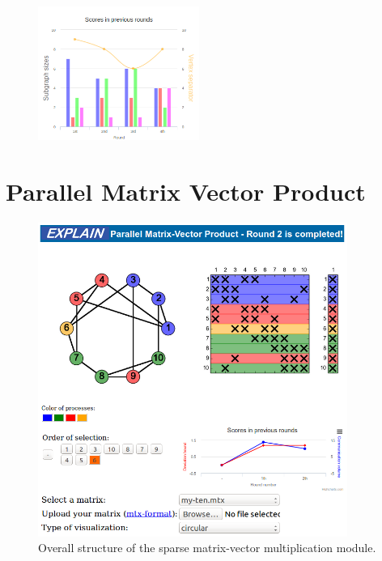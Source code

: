 \documentclass[12pt, oneside]{book}
\begin{document}
\begin{figure}
\centering
\includegraphics[width=0.47\textwidth]{chart2}
\caption{}
\label{barchart}
\end{figure}

\section{Parallel Matrix Vector Product}
\cite{2015:3}
\begin{figure}
\centering
\includegraphics[width=0.9\textwidth]{final}
\caption{Overall structure of the sparse matrix-vector multiplication module.}
\label{f.explain2}
\end{figure}
\end{document}
